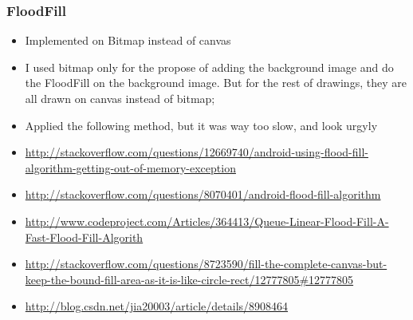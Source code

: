 \documentclass[9pt,b5paper]{article}
\begin{document}
\subsubsection{FloodFill}
\label{sec-6-2-3}
\begin{itemize}
\item Implemented on Bitmap instead of canvas
\item I used bitmap only for the propose of adding the background image and do the FloodFill on the background image. But for the rest of drawings, they are all drawn on canvas instead of bitmap;
\item Applied the following method, but it was way too slow, and look urgyly
\item \url{http://stackoverflow.com/questions/12669740/android-using-flood-fill-algorithm-getting-out-of-memory-exception}
\item \url{http://stackoverflow.com/questions/8070401/android-flood-fill-algorithm}
\item \url{http://www.codeproject.com/Articles/364413/Queue-Linear-Flood-Fill-A-Fast-Flood-Fill-Algorith}
\item \url{http://stackoverflow.com/questions/8723590/fill-the-complete-canvas-but-keep-the-bound-fill-area-as-it-is-like-circle-rect/12777805#12777805}
\item \url{http://blog.csdn.net/jia20003/article/details/8908464}
\end{itemize}
\end{document}
